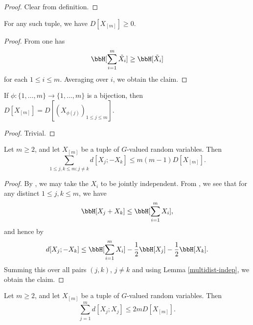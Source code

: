 \begin{proof}\leanok  Clear from definition.
\end{proof}

\begin{lemma}[Nonnegativity]\label{multidist-nonneg}\leanok  For any such tuple, we have $D[X_{[m]}] \geq 0$.
\end{lemma}

\begin{proof}\leanok  From  one has
$$ \bbH[\sum_{i =1}^m \tilde X_i] \geq \bbH[\tilde X_i]$$
for each $1 \leq i \leq m$.  Averaging over $i$, we obtain the claim.
\end{proof}

\begin{lemma}[Relabeling]\label{multidist-perm}\leanok If $\phi: \{1,\dots,m\} \to \{1,\dots,m\}$ is a bijection, then $D[X_{[m]}] = D[(X_{\phi(j)})_{1 \leq j \leq m}]$.
\end{lemma}

\begin{proof}\leanok Trivial.
\end{proof}

\begin{lemma}\label{multidist-ruzsa-I}\leanok
  Let $m \ge 2$, and let $X_{[m]}$ be a tuple of $G$-valued random variables. Then
  $$\sum_{1 \leq j,k \leq m: j \neq k} d[X_j; -X_k] \leq m(m-1) D[X_{[m]}].$$
\end{lemma}

\begin{proof}\leanok
By ,  we may take the $X_i$ to be jointly independent.  From , we see that for any distinct $1 \leq j,k \leq m$, we have
  \[
    \bbH[X_j+X_k] \leq \bbH[\sum_{i=1}^m X_i],
  \]
  and hence by 
  \[
    d[X_j;-X_k] \leq \bbH[\sum_{i=1}^m X_i] - \frac{1}{2} \bbH[X_j] - \frac{1}{2} \bbH[X_k].
  \]
  Summing this over all pairs $(j,k)$, $j \neq k$ and using Lemma \ref{multidist-indep}, we obtain the claim.
\end{proof}

\begin{lemma}\label{multidist-ruzsa-II}\leanok
  Let $m \ge 2$, and let $X_{[m]}$ be a tuple of $G$-valued random variables. Then
  $$\sum_{j=1}^m d[X_j;X_j] \leq 2 m D[X_{[m]}].$$
\end{lemma}

